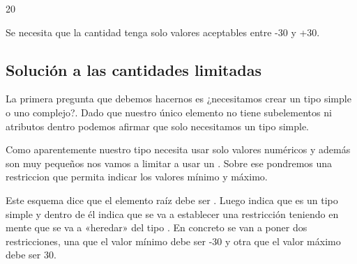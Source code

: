 \documentclass[letterpaper,10pt,spanish]{sphinxmanual}
\begin{document}
\begin{sphinxVerbatim}[commandchars=\\\{\}]
20
\end{sphinxVerbatim}

Se necesita que la cantidad tenga solo valores aceptables entre -30 y +30.


\subsection{Solución a las cantidades limitadas}
\label{\detokenize{tema5:solucion-a-las-cantidades-limitadas}}
La primera pregunta que debemos hacernos es ¿necesitamos crear un tipo simple o uno complejo?. Dado que nuestro único elemento no tiene subelementos ni atributos dentro podemos afirmar que solo necesitamos un tipo simple.

Como aparentemente nuestro tipo necesita usar solo valores numéricos y además son muy pequeños nos vamos a limitar a usar un . Sobre ese  pondremos una restriccion que permita indicar los valores mínimo y máximo.

\begin{sphinxVerbatim}[commandchars=\\\{\}]
 
     
             
                 
                 
\end{sphinxVerbatim}

Este esquema dice que el elemento raíz debe ser . Luego indica que es un tipo simple y dentro de él indica que se va a establecer una restricción teniendo en mente que se va a «heredar» del tipo . En concreto se van a poner dos restricciones, una que el valor mínimo debe ser -30 y otra que el valor máximo debe ser 30.
\end{document}

